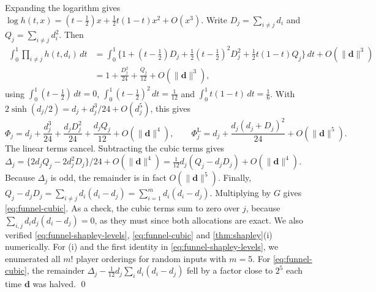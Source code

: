 Expanding the logarithm gives $\log h(t,x)=(t-\tfrac12)x+\tfrac12t(1-t)x^2+O(x^3)$. Write $D_j=\sum_{i\ne j}d_i$ and $Q_j=\sum_{i\ne j}d_i^2$. Then
\[
\begin{aligned}
  \int_0^1\prod_{i\ne j}h(t,d_i)\,dt
  &=\int_0^1\Big\{1+(t-\tfrac12)D_j+\tfrac12(t-\tfrac12)^2D_j^2+\tfrac12t(1-t)Q_j\Big\}\,dt+O(\|\bm d\|^3)\\
  &=1+\frac{D_j^2}{24}+\frac{Q_j}{12}+O(\|\bm d\|^3),
\end{aligned}
\]
using $\int_0^1(t-\tfrac12)\,dt=0$, $\int_0^1(t-\tfrac12)^2\,dt=\tfrac1{12}$ and $\int_0^1t(1-t)\,dt=\tfrac16$. With $2\sinh(d_j/2)=d_j+d_j^3/24+O(d_j^5)$, this gives
\[
  \Phi_j=d_j+\frac{d_j^3}{24}+\frac{d_jD_j^2}{24}+\frac{d_jQ_j}{12}+O(\|\bm d\|^4),
  \qquad
  \Phi_j^{\mathrm L}=d_j+\frac{d_j(d_j+D_j)^2}{24}+O(\|\bm d\|^5).
\]
The linear terms cancel. Subtracting the cubic terms gives $\Delta_j=\{2d_jQ_j-2d_j^2D_j\}/24+O(\|\bm d\|^4)=\tfrac1{12}d_j(Q_j-d_jD_j)+O(\|\bm d\|^4)$. Because $\Delta_j$ is odd, the remainder is in fact $O(\|\bm d\|^5)$. Finally, $Q_j-d_jD_j=\sum_{i\ne j}d_i(d_i-d_j)=\sum_{i=1}^md_i(d_i-d_j)$. Multiplying by $G$ gives \eqref{eq:funnel-cubic}. As a check, the cubic terms sum to zero over $j$, because $\sum_{i,j}d_id_j(d_i-d_j)=0$, as they must since both allocations are exact. We also verified \eqref{eq:funnel-shapley-levels}, \eqref{eq:funnel-cubic} and \cref{thm:shapley}(i) numerically. For (i) and the first identity in \eqref{eq:funnel-shapley-levels}, we enumerated all $m!$ player orderings for random inputs with $m=5$. For \eqref{eq:funnel-cubic}, the remainder $\Delta_j-\tfrac1{12}d_j\sum_id_i(d_i-d_j)$ fell by a factor close to $2^5$ each time $\bm d$ was halved. \qed
